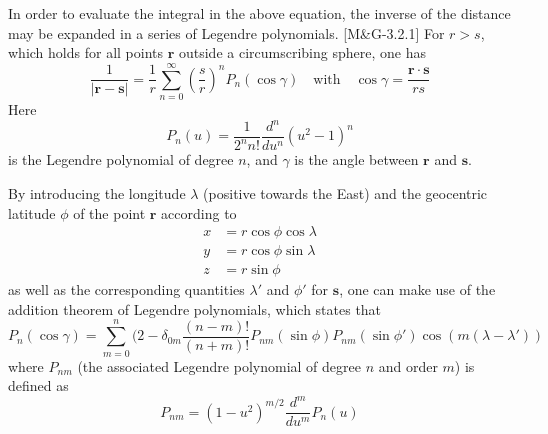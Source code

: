 \documentclass[11pt]{article}
\begin{document}
In order to evaluate the integral in the above equation,
the inverse of the distance may be expanded in a series of Legendre
polynomials. [M\&G-3.2.1] For $r > s$, which holds for all points $\boldsymbol{r}$
outside a circumscribing sphere, one has
\begin{equation}
  \frac{1}{|\boldsymbol{r} - \boldsymbol{s}|}
  = \frac{1}{r}\sum_{n = 0}^{\infty}\left(\frac{s}{r}\right)^nP_n(\cos\gamma)
  \quad \text{with} \quad \cos\gamma = \frac{\boldsymbol{r}\cdot\boldsymbol{s}}{rs}
  \label{3.5}\tag{3.5}
\end{equation}
Here
\begin{equation}
  P_n(u) = \frac{1}{2^nn!}\frac{d^n}{du^n}(u^2 - 1)^n \label{3.6}\tag{3.6}
\end{equation}
is the Legendre polynomial of degree $n$, and $\gamma$ is the angle
between $\boldsymbol{r}$ and $\boldsymbol{s}$.

By introducing the longitude $\lambda$ (positive towards the East) and
the geocentric latitude $\phi$ of the point $\boldsymbol{r}$ according
to
\begin{align}
  x &= r\cos\phi\cos\lambda \nonumber \\
  y &= r\cos\phi\sin\lambda \nonumber \\
  z &= r\sin\phi \label{3.7}\tag{3.7}
\end{align}
as well as the corresponding quantities $\lambda'$ and $\phi'$ for
$\boldsymbol{s}$, one can make use of the addition theorem of Legendre
polynomials, which states that
\begin{equation}
  P_n(\cos\gamma) = \sum_{m = 0}^n(2 - \delta_{0m}
  \frac{(n - m)!}{(n + m)!}P_{nm}(\sin\phi)P_{nm}(\sin\phi')\cos(m(\lambda - \lambda'))
  \label{3.8}\tag{3.8}
\end{equation}
where $P_{nm}$ (the associated Legendre polynomial of degree $n$ and
order $m$) is defined as
\begin{equation}
  P_{nm} = (1 - u^2)^{m/2}\frac{d^m}{du^m}P_n(u) \label{3.9}\tag{3.9}
\end{equation}
\end{document}
